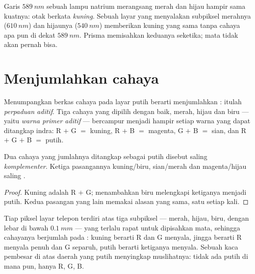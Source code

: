 \begin{example}\label{ex:g11:color-light-sources:yellows}
Garis $\qty{589}{nm}$ sebuah lampu natrium merangsang  merah
dan hijau hampir sama kuatnya: otak berkata \emph{kuning}. Sebuah layar
yang menyalakan subpiksel merahnya ($\qty{610}{nm}$) dan hijaunya
($\qty{540}{nm}$) memberikan kuning yang sama tanpa cahaya apa pun di
dekat $\qty{589}{nm}$. Prisma memisahkan keduanya seketika; mata tidak
akan pernah bisa.
\end{example}

\section{Menjumlahkan cahaya}

\begin{definition}\label{def:g11:color-light-sources:additive}
Menumpangkan berkas cahaya pada layar putih berarti menjumlahkan
: itulah \emph{perpaduan aditif}.
Tiga cahaya yang dipilih dengan baik, merah, hijau dan biru --- yaitu
\emph{warna primer aditif} --- bercampur menjadi
hampir setiap warna yang dapat ditangkap indra: R $+$ G $=$ kuning,
R $+$ B $=$ magenta, G $+$ B $=$ sian, dan R $+$ G $+$ B $=$ putih.
\end{definition}

\begin{proposition}\label{prop:g11:color-light-sources:complementary}
Dua cahaya yang jumlahnya ditangkap sebagai putih disebut saling
\emph{komplementer}. Ketiga pasangannya
kuning/biru, sian/merah dan magenta/hijau saling .
\end{proposition}

\begin{proof}
Kuning adalah R $+$ G; menambahkan biru melengkapi ketiganya menjadi
putih. Kedua pasangan yang lain memakai alasan yang sama, satu  setiap kali.
\end{proof}

\begin{example}[Layar]\label{ex:g11:color-light-sources:screen}
Tiap piksel layar telepon terdiri atas tiga subpiksel --- merah, hijau,
biru, dengan lebar di bawah $\qty{0.1}{mm}$ --- yang terlalu rapat
untuk dipisahkan mata, sehingga cahayanya berjumlah pada : kuning
berarti R dan G menyala, jingga berarti R menyala penuh dan G separuh,
putih berarti ketiganya menyala. Sebuah kaca pembesar di atas daerah
yang putih menyingkap muslihatnya: tidak ada putih di mana pun, hanya R,
G, B.
\end{example}

